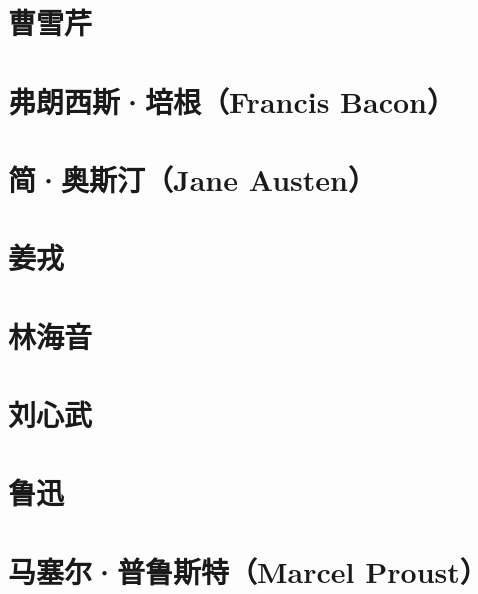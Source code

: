 \documentclass[12pt,utf8]{book}
\begin{document}
% 


\chapter{曹雪芹}


\clearpage

\chapter{弗朗西斯·培根（Francis Bacon）}


% 


\chapter{简·奥斯汀（Jane Austen）}

% 


\chapter{姜戎}


% 

\chapter{林海音}

% 

\chapter{刘心武}

% 

\chapter{鲁迅}


\clearpage


\chapter{马塞尔·普鲁斯特（Marcel Proust）}

% 
\end{document}
